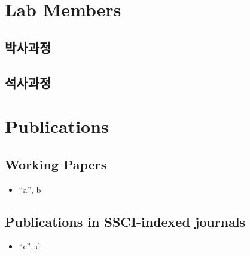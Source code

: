 \documentclass[
]{book}
\providecommand{\tightlist}{%
  \setlength{\itemsep}{0pt}\setlength{\parskip}{0pt}}
\begin{document}
\hypertarget{lab-members}{%
\chapter{Lab Members}\label{lab-members}}

\hypertarget{uxbc15uxc0acuxacfcuxc815}{%
\section{박사과정}\label{uxbc15uxc0acuxacfcuxc815}}

\hypertarget{uxc11duxc0acuxacfcuxc815}{%
\section{석사과정}\label{uxc11duxc0acuxacfcuxc815}}

\hypertarget{publications}{%
\chapter{Publications}\label{publications}}

\hypertarget{working-papers}{%
\section{Working Papers}\label{working-papers}}

\begin{itemize}
\tightlist
\item
  ``a'', b
\end{itemize}

\hypertarget{publications-in-ssci-indexed-journals}{%
\section{Publications in SSCI-indexed journals}\label{publications-in-ssci-indexed-journals}}

\begin{itemize}
\tightlist
\item
  ``c'', d
\end{itemize}

  
\end{document}
